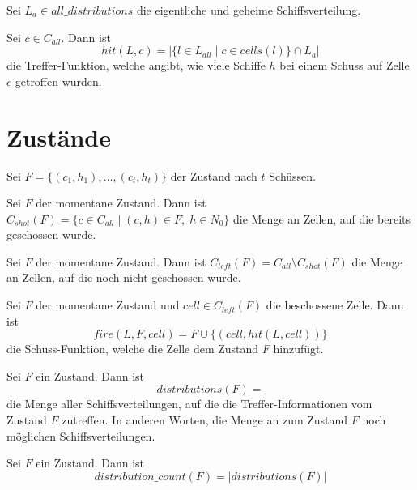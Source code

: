 \documentclass[a4paper,12pt]{llncs}
\numberwithin{equation}{section}
\begin{document}
\begin{definition}
Sei $L_a \in all\_distributions$ die eigentliche und geheime Schiffsverteilung.
\end{definition}

\begin{definition}
Sei $c \in C_{all}$.
Dann ist 
\[
hit(L, c)=|\{l \in L_{all} \mid c \in cells(l)\} \cap L_a|
\]
die Treffer-Funktion, welche angibt, wie viele Schiffe $h$ bei einem Schuss auf Zelle $c$ getroffen wurden.
\end{definition}

\section{Zustände}

\begin{definition}
Sei $F=\{(c_1, h_1), \dots , (c_t, h_t)\}$ der Zustand nach $t$ Schüssen.
\end{definition}

\begin{definition}
Sei $F$ der momentane Zustand.
Dann ist $C_{shot}(F)=\{c \in C_{all} \mid (c,h) \in F, \; h \in N_0\}$ die Menge an Zellen, auf die bereits geschossen wurde.
\end{definition}

\begin{definition}
Sei $F$ der momentane Zustand.
Dann ist $C_{left}(F)=C_{all} \setminus C_{shot}(F)$ die Menge an Zellen, auf die noch nicht geschossen wurde.
\end{definition}

\begin{definition}
Sei $F$ der momentane Zustand und $cell \in C_{left}(F)$ die beschossene Zelle.
Dann ist
\[
fire(L, F, cell)=F \cup \{(cell,hit(L, cell))\}
\]
die Schuss-Funktion, welche die Zelle dem Zustand $F$ hinzufügt.
\end{definition}

\begin{definition}
Sei $F$ ein Zustand.
Dann ist
\[
distributions(F)=
\]
die Menge aller Schiffsverteilungen, auf die die Treffer-Informationen vom Zustand $F$ zutreffen.
In anderen Worten, die Menge an zum Zustand $F$ noch möglichen Schiffsverteilungen.
\end{definition}

\begin{definition}
Sei $F$ ein Zustand.
Dann ist
\[
distribution\_count(F)=|distributions(F)|
\]
\end{definition}
\end{document}
